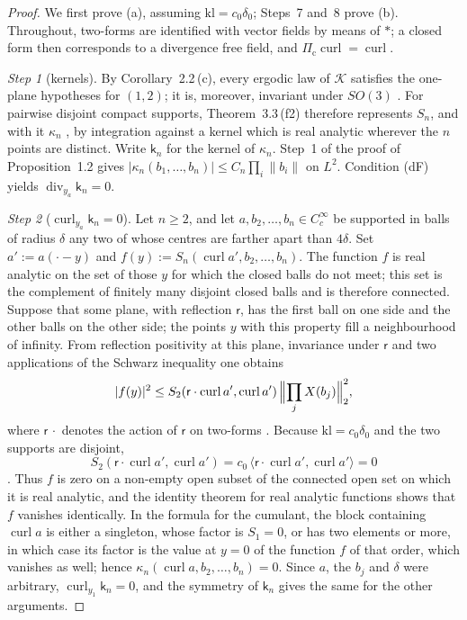 \documentclass[11pt,letterpaper,reqno]{amsart}
\theoremstyle{definition}
\begin{document}
\begin{proof}
We first prove (a), assuming $\mathrm{kl}=c_0\delta_0$; Steps~7 and~8 prove (b).
Throughout, two-forms are identified with vector fields by means of $\ast$; a closed form then corresponds to a divergence free field, and $\Pi_{\mathrm c}\operatorname{curl}=\operatorname{curl}$.

\emph{Step 1} (kernels).
By Corollary~2.2\,(c), every ergodic law of $\mathcal K$ satisfies the one-plane hypotheses for $(1,2)$; it is, moreover, invariant under $SO(3)$ \cite[Theorem~1.4, Part~I\,(a), (f)]{QEDII}.
For pairwise disjoint compact supports, Theorem~3.3\,(f2) therefore represents $S_n$, and with it $\kappa_n$ \cite[(n5)]{QEDIII}, by integration against a kernel which is real analytic wherever the $n$ points are distinct.
Write $\mathsf k_n$ for the kernel of $\kappa_n$.
Step~1 of the proof of Proposition~1.2 gives $|\kappa_n(b_1,\dots,b_n)|\le C_n\prod_i\|b_i\|$ on $L^2$.
Condition (dF) yields $\operatorname{div}_{y_a}\mathsf k_n=0$.

\emph{Step 2} ($\operatorname{curl}_{y_a}\mathsf k_n=0$).
Let $n\ge2$, and let $a,b_2,\dots,b_n\in C_c^\infty$ be supported in balls of radius $\delta$ any two of whose centres are farther apart than $4\delta$.
Set $a':=a(\cdot-y)$ and $f(y):=S_n(\operatorname{curl}a',b_2,\dots,b_n)$.
The function $f$ is real analytic on the set of those $y$ for which the closed balls do not meet; this set is the complement of finitely many disjoint closed balls and is therefore connected.
Suppose that some plane, with reflection $\mathsf r$, has the first ball on one side and the other balls on the other side; the points $y$ with this property fill a neighbourhood of infinity.
From reflection positivity at this plane, invariance under $\mathsf r$ \cite[Theorem~1.4, Part~I\,(b), (f)]{QEDII} and two applications of the Schwarz inequality one obtains
\begin{equation*}
|f(y)|^2\le S_2(\mathsf r\cdot\operatorname{curl}a',\operatorname{curl}a')\,\Bigl\|\prod_jX(b_j)\Bigr\|_2^2,
\end{equation*}
where $\mathsf r\,\cdot$ denotes the action of $\mathsf r$ on two-forms \cite[Section~1.2]{QEDII}.
Because $\mathrm{kl}=c_0\delta_0$ and the two supports are disjoint,
\begin{equation*}
S_2(\mathsf r\cdot\operatorname{curl}a',\operatorname{curl}a')=c_0\,\langle\mathsf r\cdot\operatorname{curl}a',\operatorname{curl}a'\rangle=0
\end{equation*}
\cite[Theorem~1.4, Part~I\,(d), (f)]{QEDII}.
Thus $f$ is zero on a non-empty open subset of the connected open set on which it is real analytic, and the identity theorem for real analytic functions \cite[Lemma~14.10\,(b)]{QEDII} shows that $f$ vanishes identically.
In the formula for the cumulant, the block containing $\operatorname{curl}a$ is either a singleton, whose factor is $S_1=0$, or has two elements or more, in which case its factor is the value at $y=0$ of the function $f$ of that order, which vanishes as well; hence $\kappa_n(\operatorname{curl}a,b_2,\dots,b_n)=0$.
Since $a$, the $b_j$ and $\delta$ were arbitrary, $\operatorname{curl}_{y_1}\mathsf k_n=0$, and the symmetry of $\mathsf k_n$ gives the same for the other arguments.


\end{proof}
\end{document}
